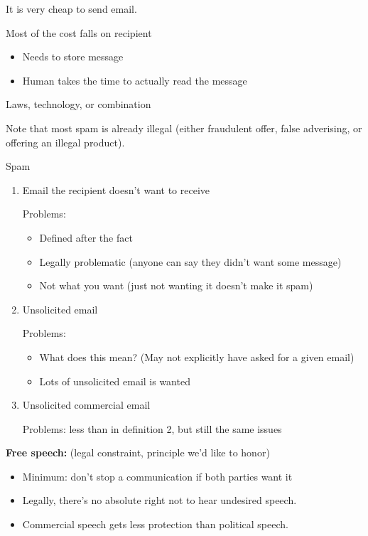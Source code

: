 It is very cheap to send email.

Most of the cost falls on recipient
\begin{itemize}
    \item Needs to store message
    \item Human takes the time to actually read the message
\end{itemize}

Laws, technology, or combination

Note that most spam is already illegal (either fraudulent offer, false
    adverising, or offering an illegal product).

\begin{definition}{Spam}
\begin{enumerate}
    \item Email the recipient doesn't want to receive

        Problems:
        \begin{itemize}
            \item Defined after the fact
            \item Legally problematic (anyone can say they didn't want some
                    message)
            \item Not what you want (just not wanting it doesn't make it spam)
        \end{itemize}
    \item Unsolicited email

        Problems:
        \begin{itemize}
            \item What does this mean? (May not explicitly have asked for a
                    given email)
            \item Lots of unsolicited email is wanted
        \end{itemize}
    \item Unsolicited commercial email

        Problems: less than in definition 2, but still the same issues
\end{enumerate}
\end{definition}

{\bf Free speech:} (legal constraint, principle we'd like to honor)
\begin{itemize}
    \item Minimum: don't stop a communication if both parties want it
    \item Legally, there's no absolute right not to hear undesired speech.
    \item Commercial speech gets less protection than political speech.
\end{itemize}

